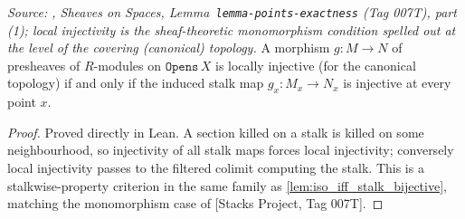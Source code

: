 \begin{lemma}
  \label{lem:locally_injective_iff_stalk}
  \textit{Source: \cite{stacks-project}, Sheaves on Spaces, Lemma~\texttt{lemma-points-exactness}
  (Tag 007T), part (1); local injectivity is the sheaf-theoretic monomorphism condition
  spelled out at the level of the covering (canonical) topology.}
  A morphism \(g\colon M \to N\) of presheaves of \(R\)-modules on \(\mathtt{Opens}\,X\)
  is locally injective (for the canonical topology) if and only if the induced stalk map
  \(g_x\colon M_x \to N_x\) is injective at every point \(x\).
\end{lemma}
\begin{proof}
  Proved directly in Lean. A section killed on a stalk is killed on some neighbourhood,
  so injectivity of all stalk maps forces local injectivity; conversely local
  injectivity passes to the filtered colimit computing the stalk. This is a
  stalkwise-property criterion in the same family as \cref{lem:iso_iff_stalk_bijective},
  matching the monomorphism case of [Stacks Project, Tag 007T].
\end{proof}

